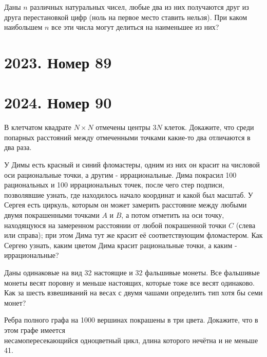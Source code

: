 \documentclass[11pt, a4paper]{common/document_template}
\begin{document}
\begin{exercise}
Даны $n$ различных натуральных чисел, любые два из них получаются друг из друга перестановкой цифр (ноль на первое место ставить нельзя). При каком наибольшем $n$ все эти числа могут делиться на наименьшее из них?
\end{exercise}

\chapter{2023. Номер 89}

\chapter{2024. Номер 90}

\begin{exercise}
В клетчатом квадрате $N \times N$ отмечены центры $3N$ клеток. Докажите, что среди попарных расстояний между отмеченными точками какие-то два отличаются в два раза.
\end{exercise}

\begin{exercise}
У Димы есть красный и синий фломастеры, одним из них он красит на числовой оси рациональные точки, а другим - иррациональные. Дима покрасил 100 рациональных и 100 иррациональных точек, после чего стер подписи, позволявшие узнать, где находилось начало координат и какой был масштаб. У Сергея есть циркуль, которым он может замерить расстояние между любыми двумя покрашенными точками $A$ и $B$, а потом отметить на оси точку, находящуюся на замеренном расстоянии от любой покрашенной точки $C$ (слева или справа); при этом Дима тут же красит её соответствующим фломастером. Как Сергею узнать, каким цветом Дима красит рациональные точки, а каким - иррациональные?
\end{exercise}

\begin{exercise}
Даны одинаковые на вид 32 настоящие и 32 фальшивые монеты. Все фальшивые монеты весят поровну и меньше настоящих, которые тоже все весят одинаково. Как за шесть взвешиваний на весах с двумя чашами определить тип хотя бы семи монет?
\end{exercise}

\begin{exercise}
Ребра полного графа на 1000 вершинах покрашены в три цвета. Докажите,
что в этом графе имеется \\ несамопересекающийся одноцветный цикл, длина которого нечётна и не меньше 41.
\end{exercise}
\end{document}
